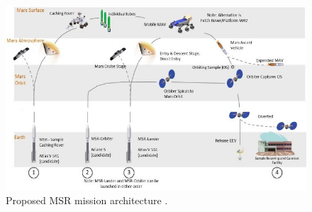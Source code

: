 \begin{figure}[!ht]
\centering
\includegraphics[width=0.8 \textwidth]{figures/heritage/proposedMSRmissionArchitecture_vaughan2016technology.jpg}
\caption{Proposed \ac{MSR} mission architecture \citep{vaughan2016technology}.}
\label{fig:proposedMSRmissionArchitecture_vaughan2016technology}
\end{figure}




